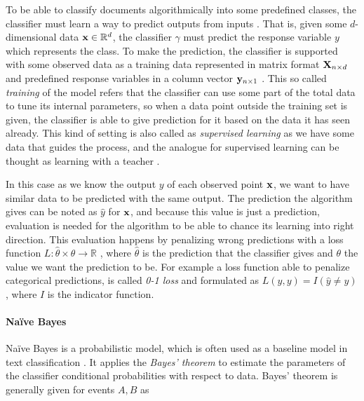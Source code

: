 To be able to classify documents algorithmically into some predefined classes, the classifier must learn a way to predict outputs from inputs \cite{hastie_09_elements-of.statistical-learning}. That is, given some $d$-dimensional data $\mathbf{x} \in \mathbb{R}^d$, the classifier $\gamma$ must predict the response variable $y$ which represents the class. To make the prediction, the classifier is supported with some observed data as a training data represented in matrix format $\mathbf{X}_{n \times d}$ and predefined response variables in a column vector $\mathbf{y}_{n \times 1}$ \cite{hastie_09_elements-of.statistical-learning}. This so called \emph{training} of the model refers that the classifier can use some part of the total data to tune its internal parameters, so when a data point outside the training set is given, the classifier is able to give prediction for it based on the data it has seen already. This kind of setting is also called as \emph{supervised learning} as we have some data that guides the process, and the analogue for supervised learning can be thought as learning with a teacher \cite{hastie_09_elements-of.statistical-learning}.

In this case as we know the output $y$ of each observed point $\mathbf{x}$, we want to have similar data to be predicted with the same output. The prediction the algorithm gives can be noted as $\hat{y}$ for $\mathbf{x}$, and because this value is just a prediction, evaluation is needed for the algorithm to be able to chance its learning into right direction. This evaluation happens by penalizing wrong predictions with a loss function $L: \hat{\theta} \times \theta \rightarrow \mathbb{R}$ \cite{hastie_09_elements-of.statistical-learning}, where $\hat{\theta}$ is the prediction that the classifier gives and $\theta$ the value we want the prediction to be. For example a loss function able to penalize categorical predictions, is called \emph{0-1 loss} and formulated as $L(\hat{y}, y) = I(\hat{y} \neq y)$, where $I$ is the indicator function. 



\paragraph{Naïve Bayes}


Naïve Bayes is a probabilistic model, which is often used as a baseline model in text classification \cite{acemNBtc2001}. It applies the \emph{Bayes' theorem} to estimate the parameters of the classifier \ie conditional probabilities with respect to data. Bayes' theorem is generally given for events $A, B$ as 

